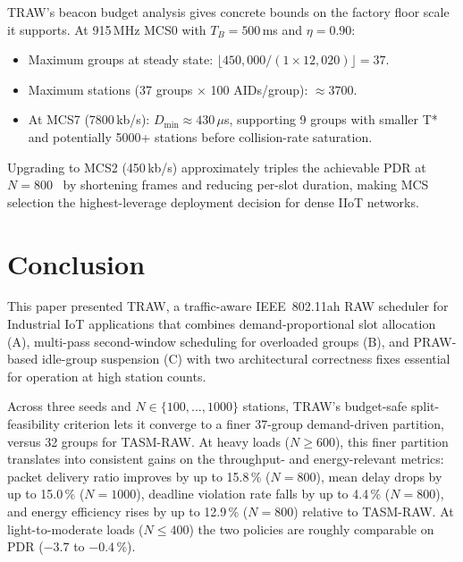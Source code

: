 \documentclass[journal]{IEEEtran}
\begin{document}
TRAW's beacon budget analysis gives concrete bounds on the factory
floor scale it supports.
At 915\,MHz MCS0 with $T_B\!=\!500$\,ms and $\eta\!=\!0.90$:
\begin{itemize}
  \item Maximum groups at steady state: $\lfloor 450{,}000 / (1\!\times\!12{,}020)\rfloor\!=\!37$.
  \item Maximum stations (37 groups $\times$ 100 AIDs/group): $\approx\!3700$.
  \item At MCS7 (7800\,kb/s): $D_\mathrm{min}\!\approx\!430\,\mu$s,
        supporting 9 groups with smaller T* and potentially 5000+
        stations before collision-rate saturation.
\end{itemize}
Upgrading to MCS2 (450\,kb/s) approximately triples the achievable PDR
at $N\!=\!800$~\cite{kalita2025b} by shortening frames and reducing
per-slot duration, making MCS selection the highest-leverage deployment
decision for dense IIoT networks.

\section{Conclusion}
\label{sec:conc}

This paper presented TRAW, a traffic-aware IEEE~802.11ah RAW scheduler
for Industrial IoT applications that combines demand-proportional slot
allocation (A), multi-pass second-window scheduling for overloaded groups (B),
and PRAW-based idle-group suspension (C) with two architectural
correctness fixes essential for operation at high station counts.

Across three seeds and $N\!\in\!\{100,\ldots,1000\}$ stations, TRAW's
budget-safe split-feasibility criterion lets it converge to a finer
37-group demand-driven partition, versus 32 groups for TASM-RAW. At
heavy loads ($N\!\geq\!600$), this finer partition translates into
consistent gains on the throughput- and energy-relevant metrics:
packet delivery ratio improves by up to 15.8\,\% ($N\!=\!800$), mean
delay drops by up to 15.0\,\% ($N\!=\!1000$), deadline violation rate
falls by up to 4.4\,\% ($N\!=\!800$), and energy efficiency rises by up
to 12.9\,\% ($N\!=\!800$) relative to TASM-RAW. At light-to-moderate
loads ($N\!\leq\!400$) the two policies are roughly comparable on PDR
($-3.7$ to $-0.4$\,\%).
\end{document}
